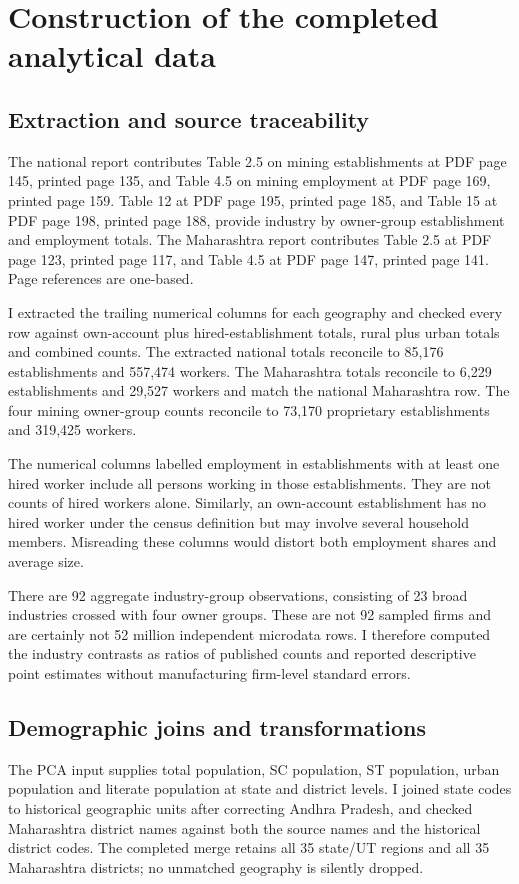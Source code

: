 \documentclass[11pt,a4paper]{report}
\begin{document}
\chapter{Construction of the completed analytical data}
\section{Extraction and source traceability}
The national report contributes Table 2.5 on mining establishments at PDF page 145, printed page 135, and Table 4.5 on mining employment at PDF page 169, printed page 159. Table 12 at PDF page 195, printed page 185, and Table 15 at PDF page 198, printed page 188, provide industry by owner-group establishment and employment totals. The Maharashtra report contributes Table 2.5 at PDF page 123, printed page 117, and Table 4.5 at PDF page 147, printed page 141. Page references are one-based.

I extracted the trailing numerical columns for each geography and checked every row against own-account plus hired-establishment totals, rural plus urban totals and combined counts. The extracted national totals reconcile to 85,176 establishments and 557,474 workers. The Maharashtra totals reconcile to 6,229 establishments and 29,527 workers and match the national Maharashtra row. The four mining owner-group counts reconcile to 73,170 proprietary establishments and 319,425 workers.

The numerical columns labelled employment in establishments with at least one hired worker include all persons working in those establishments. They are not counts of hired workers alone. Similarly, an own-account establishment has no hired worker under the census definition but may involve several household members. Misreading these columns would distort both employment shares and average size.

There are 92 aggregate industry-group observations, consisting of 23 broad industries crossed with four owner groups. These are not 92 sampled firms and are certainly not 52 million independent microdata rows. I therefore computed the industry contrasts as ratios of published counts and reported descriptive point estimates without manufacturing firm-level standard errors.

\section{Demographic joins and transformations}
The PCA input supplies total population, SC population, ST population, urban population and literate population at state and district levels. I joined state codes to historical geographic units after correcting Andhra Pradesh, and checked Maharashtra district names against both the source names and the historical district codes. The completed merge retains all 35 state/\allowbreak{}UT regions and all 35 Maharashtra districts; no unmatched geography is silently dropped.
\end{document}
